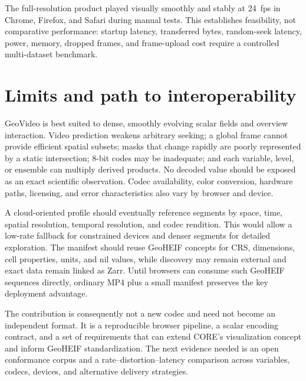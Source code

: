 \documentclass[11pt]{article}
\begin{document}
The full-resolution product played visually smoothly and stably at 24~fps in Chrome, Firefox, and Safari during manual tests. This establishes feasibility, not comparative performance: startup latency, transferred bytes, random-seek latency, power, memory, dropped frames, and frame-upload cost require a controlled multi-dataset benchmark.

\section{Limits and path to interoperability}
GeoVideo is best suited to dense, smoothly evolving scalar fields and overview interaction. Video prediction weakens arbitrary seeking; a global frame cannot provide efficient spatial subsets; masks that change rapidly are poorly represented by a static intersection; 8-bit codes may be inadequate; and each variable, level, or ensemble can multiply derived products. No decoded value should be exposed as an exact scientific observation. Codec availability, color conversion, hardware paths, licensing, and error characteristics also vary by browser and device.

A cloud-oriented profile should eventually reference segments by space, time, spatial resolution, temporal resolution, and codec rendition. This would allow a low-rate fallback for constrained devices and denser segments for detailed exploration. The manifest should reuse GeoHEIF concepts for CRS, dimensions, cell properties, units, and nil values, while discovery may remain external and exact data remain linked as Zarr. Until browsers can consume such GeoHEIF sequences directly, ordinary MP4 plus a small manifest preserves the key deployment advantage.

The contribution is consequently not a new codec and need not become an independent format. It is a reproducible browser pipeline, a scalar encoding contract, and a set of requirements that can extend CORE's visualization concept and inform GeoHEIF standardization. The next evidence needed is an open conformance corpus and a rate--distortion--latency comparison across variables, codecs, devices, and alternative delivery strategies.

\footnotesize


\end{document}
